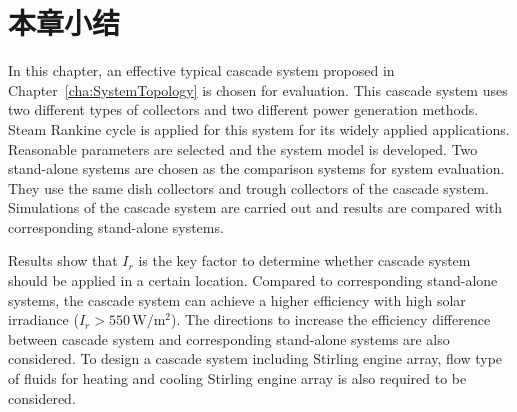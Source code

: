 \section{本章小结}

In this chapter, an effective typical cascade system proposed in Chapter~\ref{cha:SystemTopology} is chosen for evaluation. 
This cascade system uses two different types of collectors and two different power generation methods. 
Steam Rankine cycle is applied for this system for its widely applied applications.
Reasonable parameters are selected and the system model is developed.
Two stand-alone systems are chosen as the comparison systems for system evaluation. 
They use the same dish collectors and trough collectors of the cascade system. 
Simulations of the cascade system are carried out and results are compared with corresponding stand-alone systems.

Results show that $I_r$ is the key factor to determine whether cascade system should be applied in a certain location. Compared to corresponding stand-alone systems, the cascade system can achieve a higher efficiency with high solar irradiance ($I_r > 550\,\mathrm{W/m^2}$). The directions to increase the efficiency difference between cascade system and corresponding stand-alone systems are also considered. To design a cascade system including Stirling engine array, flow type of fluids for heating and cooling Stirling engine array is also required to be considered. 

